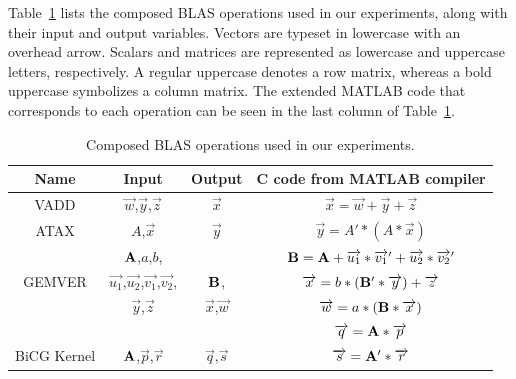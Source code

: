 \documentclass[runningheads]{llncs}
\begin{document}
Table~\ref{tbl:blas-ops} lists the composed BLAS operations used in
our experiments, along with their input and output variables. Vectors
are typeset in lowercase with an overhead arrow. Scalars and matrices
are represented as lowercase and uppercase letters, respectively. A
regular uppercase denotes a row matrix, whereas a bold uppercase
symbolizes a column matrix. The extended MATLAB code that corresponds
to each operation can be seen in the last column of
Table~\ref{tbl:blas-ops}.


\begin{table}[htb] 
\vspace{-.1in} 
\caption{Composed BLAS operations used in our experiments.}
\label{tbl:blas-ops}
\small
\centering 
\begin{tabular}{|c|c|c|c|} 
\hline 
Name & Input & Output & C code from MATLAB compiler \\ 
\hline 
\hline 
VADD & $\overrightarrow{w}$,$\overrightarrow{y}$,$\overrightarrow{z}$ & $\overrightarrow{x}$ &
$\overrightarrow{x} = \overrightarrow{w} + \overrightarrow{y} + \overrightarrow{z}$ \\ [1ex]
\hline 
ATAX & $A$,$\overrightarrow{x}$ & $\overrightarrow{y}$ & 
$\overrightarrow{y} = A' * (A * \overrightarrow{x})$ \\ [1ex]
\hline 
 & ${\bf A}$,$a$,$b$, &  & ${\bf B} = {\bf A} + \overrightarrow{u_1} * \overrightarrow{v_1}' + \overrightarrow{u_2} * \overrightarrow{v_2}'$\\
GEMVER & $\overrightarrow{u_1}$,$\overrightarrow{u_2}$,$\overrightarrow{v_1}$,$\overrightarrow{v_2}$, & ${\bf B}$,  & $\overrightarrow{x} = b * ({\bf B}' * \overrightarrow{y}) + \overrightarrow{z}$\\
& $\overrightarrow{y}$,$\overrightarrow{z}$ & $\overrightarrow{x}$,$\overrightarrow{w}$ & $\overrightarrow{w} = a * ({\bf B} * \overrightarrow{x})$\\ [1ex]
\hline 
& & & $\overrightarrow{q} = {\bf A} * \overrightarrow{p}$ \\
BiCG Kernel & ${\bf A}$,$\overrightarrow{p}$,$\overrightarrow{r}$ & $\overrightarrow{q}$,$\overrightarrow{s}$ & $\overrightarrow{s} = {\bf A}' * \overrightarrow{r}$\\ [1ex]
\hline 
\end{tabular} 
\end{table} 
\end{document}

